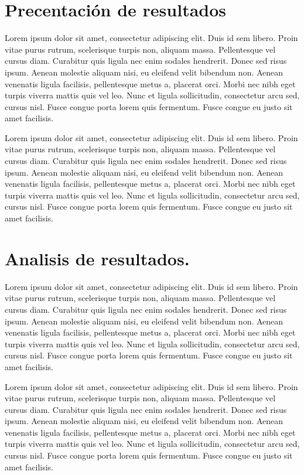 \documentclass[letter]{article}
\begin{document}
\section{Precentación de resultados}
Lorem ipsum dolor sit amet, consectetur adipiscing elit. Duis id sem libero. Proin vitae purus rutrum, scelerisque turpis non, aliquam massa. Pellentesque vel cursus diam. Curabitur quis ligula nec enim sodales hendrerit. Donec sed risus ipsum. Aenean molestie aliquam nisi, eu eleifend velit bibendum non. Aenean venenatis ligula facilisis, pellentesque metus a, placerat orci. Morbi nec nibh eget turpis viverra mattis quis vel leo. Nunc et ligula sollicitudin, consectetur arcu sed, cursus nisl. Fusce congue porta lorem quis fermentum. Fusce congue eu justo sit amet facilisis.\par
Lorem ipsum dolor sit amet, consectetur adipiscing elit. Duis id sem libero. Proin vitae purus rutrum, scelerisque turpis non, aliquam massa. Pellentesque vel cursus diam. Curabitur quis ligula nec enim sodales hendrerit. Donec sed risus ipsum. Aenean molestie aliquam nisi, eu eleifend velit bibendum non. Aenean venenatis ligula facilisis, pellentesque metus a, placerat orci. Morbi nec nibh eget turpis viverra mattis quis vel leo. Nunc et ligula sollicitudin, consectetur arcu sed, cursus nisl. Fusce congue porta lorem quis fermentum. Fusce congue eu justo sit amet facilisis.\par


\section{Analisis de resultados.}
Lorem ipsum dolor sit amet, consectetur adipiscing elit. Duis id sem libero. Proin vitae purus rutrum, scelerisque turpis non, aliquam massa. Pellentesque vel cursus diam. Curabitur quis ligula nec enim sodales hendrerit. Donec sed risus ipsum. Aenean molestie aliquam nisi, eu eleifend velit bibendum non. Aenean venenatis ligula facilisis, pellentesque metus a, placerat orci. Morbi nec nibh eget turpis viverra mattis quis vel leo. Nunc et ligula sollicitudin, consectetur arcu sed, cursus nisl. Fusce congue porta lorem quis fermentum. Fusce congue eu justo sit amet facilisis.\par
Lorem ipsum dolor sit amet, consectetur adipiscing elit. Duis id sem libero. Proin vitae purus rutrum, scelerisque turpis non, aliquam massa. Pellentesque vel cursus diam. Curabitur quis ligula nec enim sodales hendrerit. Donec sed risus ipsum. Aenean molestie aliquam nisi, eu eleifend velit bibendum non. Aenean venenatis ligula facilisis, pellentesque metus a, placerat orci. Morbi nec nibh eget turpis viverra mattis quis vel leo. Nunc et ligula sollicitudin, consectetur arcu sed, cursus nisl. Fusce congue porta lorem quis fermentum. Fusce congue eu justo sit amet facilisis.\par



\end{document}
